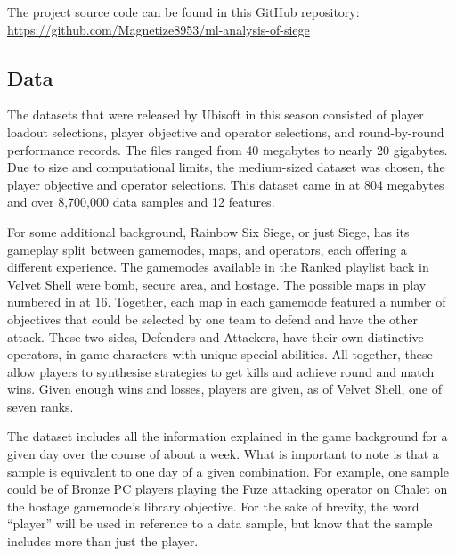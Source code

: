 \documentclass[12pt]{article}
\begin{document}
The project source code can be found in this GitHub repository:
\url{https://github.com/Magnetize8953/ml-analysis-of-siege}

\newpage

\subsection{Data}
The datasets that were released by Ubisoft in this season consisted of player loadout selections, player objective and operator selections, and round-by-round performance records.
The files ranged from 40 megabytes to nearly 20 gigabytes.
Due to size and computational limits, the medium-sized dataset was chosen, the player objective and operator selections.
This dataset came in at 804 megabytes and over 8,700,000 data samples and 12 features.

For some additional background, Rainbow Six Siege, or just Siege, has its gameplay split between gamemodes, maps, and operators, each offering a different experience.
The gamemodes available in the Ranked playlist back in Velvet Shell were bomb, secure area, and hostage.
The possible maps in play numbered in at 16.
Together, each map in each gamemode featured a number of objectives that could be selected by one team to defend and have the other attack.
These two sides, Defenders and Attackers, have their own distinctive operators, in-game characters with unique special abilities.
All together, these allow players to synthesise strategies to get kills and achieve round and match wins.
Given enough wins and losses, players are given, as of Velvet Shell, one of seven ranks.

The dataset includes all the information explained in the game background for a given day over the course of about a week.
What is important to note is that a sample is equivalent to one day of a given combination.
For example, one sample could be of Bronze PC players playing the Fuze attacking operator on Chalet on the hostage gamemode's library objective.
For the sake of brevity, the word ``player'' will be used in reference to a data sample, but know that the sample includes more than just the player.

\newpage
\end{document}
